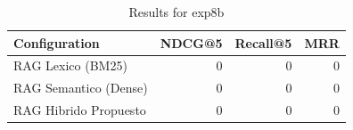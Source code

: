 \begin{table}[htbp]
  \centering
  \caption{Results for exp8b}
  \label{tab:exp8b}
  \begin{tabular}{lrrr}
    \toprule
    Configuration & NDCG@5 & Recall@5 & MRR \\
    \midrule
    RAG Lexico (BM25) & 0 & 0 & 0 \\
    RAG Semantico (Dense) & 0 & 0 & 0 \\
    RAG Hibrido Propuesto & 0 & 0 & 0 \\
    \bottomrule
  \end{tabular}
\end{table}